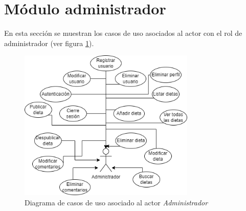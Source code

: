 \newpage
\section{Módulo administrador}
En esta sección se muestran los casos de uso asociados al actor con el rol de administrador (ver figura \ref{fig:diagrama_cu_admin}).

\begin{figure}[h!]
    \centering
    \includegraphics[width=0.75\textwidth]{Images/Capitulo4/cu-admin.png}
    \caption{Diagrama de casos de uso asociado al actor \textit{Administrador}}
    \label{fig:diagrama_cu_admin}
\end{figure}

